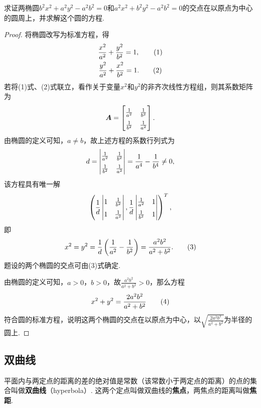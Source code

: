 \begin{example}
求证两椭圆\(b^2 x^2 + a^2 y^2 - a^2 b^2 = 0\)和\(a^2 x^2 + b^2 y^2 - a^2 b^2 = 0\)的交点在以原点为中心的圆周上，并求解这个圆的方程.
\begin{proof}
将椭圆改写为标准方程，得\begin{gather}
\frac{x^2}{a^2}+\frac{y^2}{b^2}=1, \tag1 \\
\frac{y^2}{a^2}+\frac{x^2}{b^2}=1. \tag2
\end{gather}
若将(1)式、(2)式联立，看作关于变量\(x^2\)和\(y^2\)的非齐次线性方程组，则其系数矩阵为\[
\mat{A} = \def\arraystretch{1.5} \begin{bmatrix}
\frac{1}{a^2} & \frac{1}{b^2} \\
\frac{1}{b^2} & \frac{1}{a^2}
\end{bmatrix}.
\]由椭圆的定义可知，\(a \neq b\)，故上述方程的系数行列式为\[
d = \def\arraystretch{1.5} \begin{vmatrix}
\frac{1}{a^2} & \frac{1}{b^2} \\
\frac{1}{b^2} & \frac{1}{a^2}
\end{vmatrix} = \frac{1}{a^4} - \frac{1}{b^4} \neq 0,
\]该方程具有唯一解\[
\left( \def\arraystretch{1.5}
\frac{1}{d} \begin{vmatrix}
1 & \frac{1}{b^2} \\
1 & \frac{1}{a^2}
\end{vmatrix},
\frac{1}{d} \begin{vmatrix}
\frac{1}{a^2} & 1 \\
\frac{1}{b^2} & 1
\end{vmatrix}
\right)^T,
\]即\begin{gather}
x^2 = y^2 = \frac{1}{d} \left(\frac{1}{a^2} - \frac{1}{b^2}\right)
= \frac{a^2 b^2}{a^2 + b^2}. \tag3
\end{gather}题设的两个椭圆的交点可由(3)式确定.

由椭圆的定义可知，\(a>0\)，\(b>0\)，故\(\frac{a^2 b^2}{a^2 + b^2} > 0\)，那么方程\begin{gather}
x^2 + y^2 = \frac{2 a^2 b^2}{a^2 + b^2} \tag4
\end{gather}符合圆的标准方程，说明这两个椭圆的交点在以原点为中心，以\(\sqrt{\frac{2 a^2 b^2}{a^2 + b^2}}\)为半径的圆上.
\end{proof}
\end{example}

\subsection{双曲线}
\begin{definition}
平面内与两定点的距离的差的绝对值是常数（该常数小于两定点的距离）的点的集合叫做\textbf{双曲线}（hyperbola）.
这两个定点叫做双曲线的\textbf{焦点}，两焦点的距离叫做\textbf{焦距}.
\end{definition}

